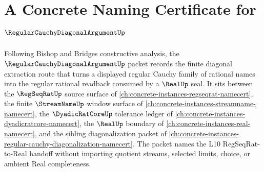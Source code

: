 \chapter{A Concrete Naming Certificate for $\RegularCauchyDiagonalArgumentUp$}
\label{ch:concrete-instances-regular-cauchy-diagonal-argument-namecert}

Following Bishop and Bridges constructive analysis, the $\RegularCauchyDiagonalArgumentUp$ packet records the finite diagonal extraction route that turns a displayed regular Cauchy family of rational names into the regular rational readback consumed by a $\RealUp$ seal. It sits between the $\RegSeqRatUp$ source surface of \autoref{ch:concrete-instances-regseqrat-namecert}, the finite $\StreamNameUp$ window surface of \autoref{ch:concrete-instances-streamname-namecert}, the $\DyadicRatCoreUp$ tolerance ledger of \autoref{ch:concrete-instances-dyadicratcore-namecert}, the $\RealUp$ boundary of \autoref{ch:concrete-instances-real-namecert}, and the sibling diagonalization packet of \autoref{ch:concrete-instances-regular-cauchy-diagonalization-namecert}. The packet names the L10 RegSeqRat-to-Real handoff without importing quotient streams, selected limits, choice, or ambient Real completeness.

